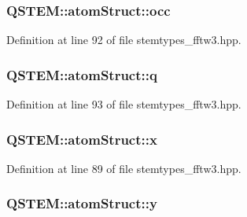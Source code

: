 \hypertarget{struct_q_s_t_e_m_1_1atom_struct_a8b71d03f3f48a5f3890fad7d7c5e978e}{
\subsubsection[{occ}]{ Q\-S\-T\-E\-M\-::atom\-Struct\-::occ}}\label{struct_q_s_t_e_m_1_1atom_struct_a8b71d03f3f48a5f3890fad7d7c5e978e}


Definition at line 92 of file stemtypes\-\_\-fftw3.\-hpp.

\hypertarget{struct_q_s_t_e_m_1_1atom_struct_a545cd1fac888ef5c20245a367321ac01}{
\subsubsection[{q}]{ Q\-S\-T\-E\-M\-::atom\-Struct\-::q}}\label{struct_q_s_t_e_m_1_1atom_struct_a545cd1fac888ef5c20245a367321ac01}


Definition at line 93 of file stemtypes\-\_\-fftw3.\-hpp.

\hypertarget{struct_q_s_t_e_m_1_1atom_struct_a317e732e7a42fe03ae1b8d3c3064ae68}{
\subsubsection[{x}]{ Q\-S\-T\-E\-M\-::atom\-Struct\-::x}}\label{struct_q_s_t_e_m_1_1atom_struct_a317e732e7a42fe03ae1b8d3c3064ae68}


Definition at line 89 of file stemtypes\-\_\-fftw3.\-hpp.

\hypertarget{struct_q_s_t_e_m_1_1atom_struct_a85ee0c4ee6a14335cdb7603a0c1d342f}{
\subsubsection[{y}]{ Q\-S\-T\-E\-M\-::atom\-Struct\-::y}}\label{struct_q_s_t_e_m_1_1atom_struct_a85ee0c4ee6a14335cdb7603a0c1d342f}


